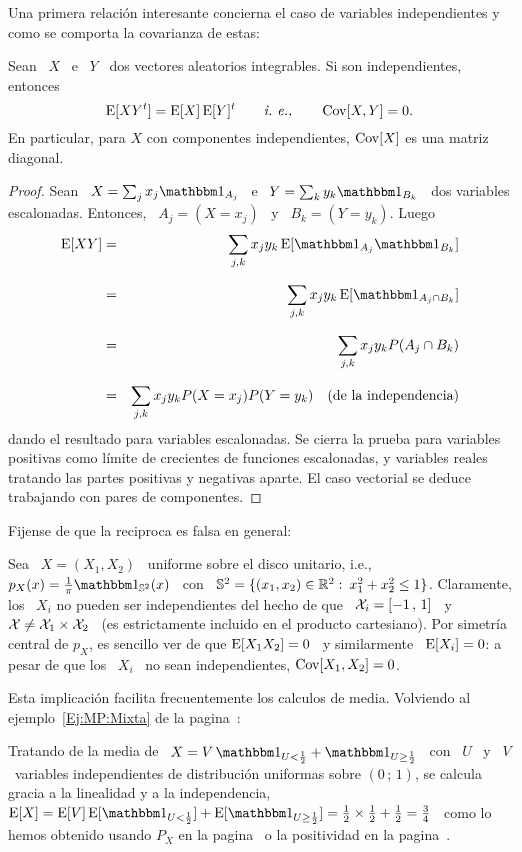 Una primera relaci\'on interesante concierna el caso de variables independientes
y como se comporta la covarianza de estas:
%
\begin{propuesta}
  Sean  \  $X$  \ e  \  $Y$  \  dos  vectores  aleatorios integrables.   Si  son
  independientes, entonces
  \[
  \operatorname{E}[X Y^t] = \operatorname{E}[X] \operatorname{E}[Y]^t \qquad \mbox{{\it i.~e.,}} \qquad \operatorname{Cov}[X,Y] = 0.
  \]
  En  particular, para  $X$  con componentes  independientes,  $\operatorname{Cov}[X]$ es  una
  matriz diagonal.
\end{propuesta}
%
\begin{proof}
  Sean \ $X = \sum_j x_j \un_{A_j}$  \ e \ $Y = \sum_k y_k \un_{B_k}$ \
  dos variables escalonadas. Entonces, \ $A_j =  (X = x_j)$ \ y \ $B_k = (Y
  = y_k)$. Luego
  \begin{eqnarray*}
  \Esp[X Y] & = & \sum_{j,k} x_j y_k \Esp[\un_{A_j} \un_{B_k}]\\[2.5mm]
  & = & \sum_{j,k} x_j y_k \Esp[\un_{A_j \cap B_k}]\\[2.5mm]
  & = & \sum_{j,k} x_j y_k P(A_j \cap B_k)\\[2.5mm]
  & = & \sum_{j,k} x_j y_k P(X = x_j) P(Y = y_k) \quad \mbox{(de la independencia)}
  \end{eqnarray*}
  dando  el resultado  para  variables  escalonadas. Se  cierra  la prueba  para
  variables positivas  como l\'imite de  crecientes de funciones  escalonadas, y
  variables  reales tratando  las partes  positivas y  negativas aparte.  El caso
  vectorial se deduce trabajando con pares de componentes.
\end{proof}
%
Fijense  de que  la  reciproca es  falsa en  general:
%
\begin{ejemplo}
  Sea \  $X =  (X_1,X_2)$ \ uniforme  sobre el  disco unitario, i.e.,  $p_X(x) =
  \frac{1}{\pi} \un_{\Sset^2}(x)$ \  con \ $\mathbb{S}^2 = \{  (x_1,x_2) \in \mathbb{R}^2:
  \:  x_1^2  +  x_2^2  \le  1  \}$.  Claramente,  los  \  $X_i$  no  pueden  ser
  independientes del hecho de que  \ $\mathcal{X}_i = [-1 \, , \, 1]$ \  y \ $\mathcal{X} \ne \mathcal{X}_1
  \times \mathcal{X}_2$  \ (es  estrictamente incluido en  el producto  cartesiano).  Por
  simetr\'ia central de  $p_X$, es sencillo ver  de que $\operatorname{E}[X_1 X_2] =  0$ \ y
  similarmente  \ $\operatorname{E}[X_i]  =  0$:  a pesar  de  que los  \  $X_i$  \ no  sean
  independientes, $\operatorname{Cov}[X_1,X_2] = 0$.
\end{ejemplo}

Esta implicaci\'on facilita frecuentemente  los calculos de media.  Volviendo al
ejemplo~\ref{Ej:MP:Mixta}  de la  pagina~\pageref{Ej:MP:Mixta}:
%
\begin{ejemplo}\label{Ej:EspMixtaInd}
  Tratando de la media de \ $X = V \, \un_{U < \frac12} + \un_{U \ge \frac12}$ \
  con \  $U$ \ y  \ $V$ \  variables independientes de  distribuci\'on uniformas
  sobre $(0 \, ; \, 1)$, se calcula gracia a la linealidad y a la independencia,
  \ $\Esp[X]  = \Esp[V]  \Esp[\un_{U < \frac12}]  + \Esp[\un_{U \ge  \frac12}] =
  \frac12 \times  \frac12 + \frac12 =  \frac34$ \ como lo  hemos obtenido usando
  $P_X$   en  la   pagina~\pageref{Ej:MP:EspMixta}  o   la  positividad   en  la
  pagina~\pageref{Ej:MP:EspMixtaPositiva}.
\end{ejemplo}

